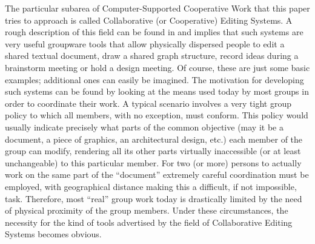 The particular subarea of Computer-Supported Cooperative Work that this paper tries to approach is called Collaborative
(or Cooperative) Editing Systems. A rough description of this field can be found in \cite{sun98a} and implies that
such systems are very useful groupware tools that allow physically dispersed people to edit a shared textual document,
draw a shared graph structure, record ideas during a brainstorm meeting or hold a design meeting. Of course, these are
just some basic examples; additional ones can easily be imagined. The motivation for developing such systems can be
found by looking at the means used today by most groups in order to coordinate their work. A typical scenario involves
a very tight group policy to which all members, with no exception, must conform. This policy would usually indicate precisely
what parts of the common objective (may it be a document, a piece of graphics, an architectural design, etc.) each member
of the group can modify, rendering all its other parts virtually inaccessible (or at least unchangeable) to this particular
member. For two (or more) persons to actually work on the same part of the ``document'' extremely careful coordination must
be employed, with geographical distance making this a difficult, if not impossible, task. Therefore, most ``real'' group
work today is drastically limited by the need of physical proximity of the group members. Under these circumstances, the
necessity for the kind of tools advertised by the field of Collaborative Editing Systems becomes obvious.

